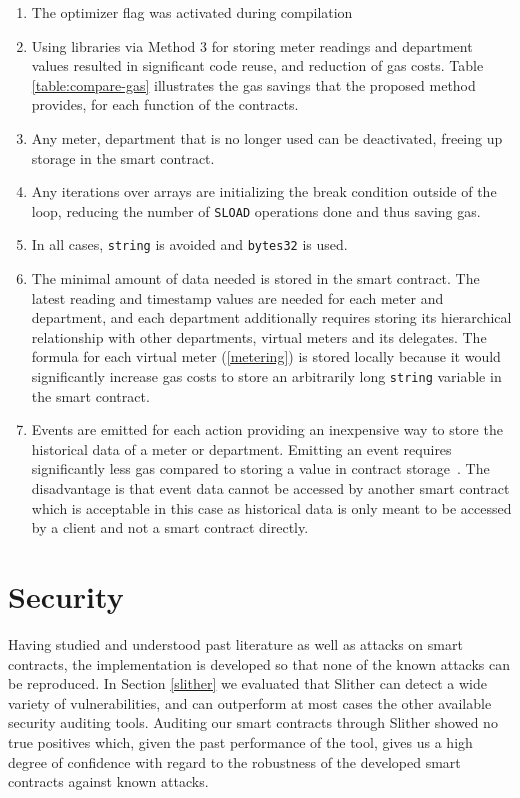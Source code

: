 \begin{enumerate}
    \item The optimizer flag was activated during compilation
    \item Using libraries via Method 3 for storing meter readings and department values resulted in significant code reuse, and reduction of gas costs. Table \ref{table:compare-gas} illustrates the gas savings that the proposed method provides, for each function of the contracts.
    \item Any meter, department that is no longer used can be deactivated, freeing up storage in the smart contract.
    \item Any iterations over arrays are initializing the break condition outside of the loop, reducing the number of \texttt{SLOAD} operations done and thus saving gas.
    \item In all cases, \texttt{string} is avoided and \texttt{bytes32} is used. %
    \item The minimal amount of data needed is stored in the smart contract. The latest reading and timestamp values are needed for each meter and department, and each department additionally requires storing its hierarchical relationship with other departments, virtual meters and its delegates. The formula for each virtual meter (\ref{metering}) is stored locally because it would significantly increase gas costs to store an arbitrarily long \texttt{string} variable in the smart contract.
    \item Events are emitted for each action providing an inexpensive way to store the historical data of a meter or department. Emitting an event requires significantly less gas compared to storing a value in contract storage~\cite{events}. The disadvantage is that event data cannot be accessed by another smart contract which is acceptable in this case as historical data is only meant to be accessed by a client and not a smart contract directly. 
\end{enumerate}



\section{Security}

Having studied and understood past literature as well as attacks on smart contracts, the implementation is developed so that none of the known attacks can be reproduced. In Section \ref{slither} we evaluated that Slither can detect a wide variety of vulnerabilities, and can outperform at most cases the other available security auditing tools. Auditing our smart contracts through Slither showed no true positives which, given the past performance of the tool, gives us a high degree of confidence with regard to the robustness of the developed smart contracts against known attacks.

